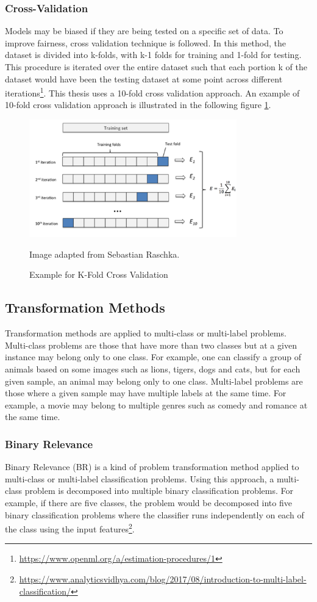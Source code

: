 \documentclass[a4paper,12pt,twoside]{report}
\begin{document}
\subsubsection{Cross-Validation} 
Models may be biased if they are being tested on a specific set of data. To improve fairness, cross validation technique is followed. In this method, the dataset is divided into k-folds, with k-1 folds for training and 1-fold for testing. This procedure is iterated over the entire dataset such that each portion k of the dataset would have been the testing dataset at some point across different iterations\footnote{\url{https://www.openml.org/a/estimation-procedures/1}}. This thesis uses a 10-fold cross validation approach. An example of 10-fold cross validation approach is illustrated in the following figure \ref{fig:k-fold}.
\begin{figure}[h] %
    \centering
    \includegraphics[width=9cm]{k-fold}
    \caption{Example for K-Fold Cross Validation}
    \small Image adapted from Sebastian Raschka\footnotemark.
    \label{fig:k-fold}
\end{figure}

\subsection{Transformation Methods}
Transformation methods are applied to multi-class or multi-label problems. Multi-class problems are those that have more than two classes but at a given instance may belong only to one class. For example, one can classify a group of animals based on some images such as lions, tigers, dogs and cats, but for each given sample, an animal may belong only to one class. Multi-label problems are those where a given sample may have multiple labels at the same time. For example, a movie may belong to multiple genres such as comedy and romance at the same time. 

\subsubsection{Binary Relevance} 
Binary Relevance (\acs{BR}) is a kind of problem transformation method applied to multi-class or multi-label classification problems. Using this approach, a multi-class problem is decomposed into multiple binary classification problems. For example, if there are five classes, the problem would be decomposed into five binary classification problems where the classifier runs independently on each of the class using the input features\footnote{\url{https://www.analyticsvidhya.com/blog/2017/08/introduction-to-multi-label-classification/}}. 
\end{document}
